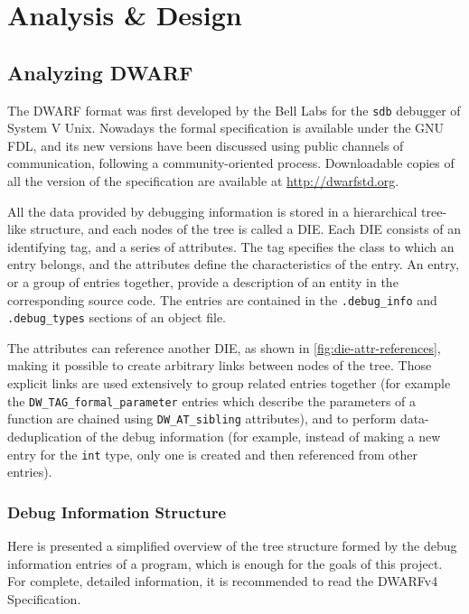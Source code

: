 \cleardoublepage
\chapter{Analysis \& Design}

\section{Analyzing DWARF}

The \gls{DWARF} format was first developed by the Bell Labs for the
\verb|sdb| debugger of System V Unix. Nowadays the formal specification
is available under the GNU \gls{FDL}, and its new versions have been
discussed using public channels of communication, following a
community-oriented process. Downloadable copies of all the version of
the specification are available at \url{http://dwarfstd.org}.

All the data provided by debugging information is stored in a hierarchical
tree-like structure, and each nodes of the tree is called a \gls{DIE}.
Each DIE consists of an identifying tag, and a series of attributes. The tag
specifies the class to which an entry belongs, and the attributes define the
characteristics of the entry. An entry, or a group of entries together,
provide a description of an entity in the corresponding source code. The
entries are contained in the \verb|.debug_info| and \verb|.debug_types|
sections of an object file.

The attributes can reference another DIE, as shown in
\autoref{fig:die-attr-references}, making it possible to create arbitrary
links between nodes of the tree. Those explicit links are used extensively to
group related entries together (for example the \verb|DW_TAG_formal_parameter|
entries which describe the parameters of a function are chained using
\verb|DW_AT_sibling| attributes), and to perform \gls{data-deduplication}
of the debug information (for example, instead of making a new entry for
the \texttt{int} type, only one is created and then referenced from other
entries).

\subsection{Debug Information Structure}

Here is presented a simplified overview of the tree structure formed by the
debug information entries of a program, which is enough for the goals of this
project. For complete, detailed information, it is recommended to read the
DWARFv4 Specification.

